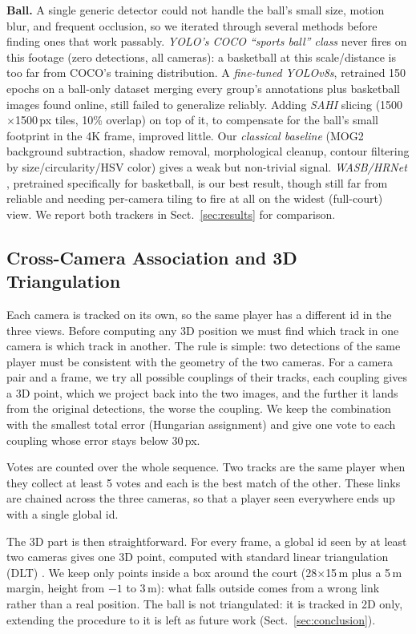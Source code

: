 \documentclass[runningheads]{llncs}
\begin{document}
\textbf{Ball.} A single generic detector could not handle the ball's small size, motion blur, and frequent occlusion, so we iterated through several methods before finding ones that work passably. \emph{YOLO's COCO ``sports ball'' class} never fires on this footage (zero detections, all cameras): a basketball at this scale/distance is too far from COCO's training distribution. A \emph{fine-tuned YOLOv8s}, retrained 150 epochs on a ball-only dataset merging every group's annotations plus basketball images found online, still failed to generalize reliably. Adding \emph{SAHI} \cite{Akyon2022} slicing (1500$\times$1500\,px tiles, 10\% overlap) on top of it, to compensate for the ball's small footprint in the 4K frame, improved little. Our \emph{classical baseline} (MOG2 background subtraction, shadow removal, morphological cleanup, contour filtering by size/circularity/HSV color) gives a weak but non-trivial signal. \emph{WASB/HRNet} \cite{Tarashima2023}, pretrained specifically for basketball, is our best result, though still far from reliable and needing per-camera tiling to fire at all on the widest (full-court) view. We report both trackers in Sect.~\ref{sec:results} for comparison.

\subsection{Cross-Camera Association and 3D Triangulation}
\label{sec:3d_tracking}

Each camera is tracked on its own, so the same player has a different id in the three views. Before computing any 3D position we must find which track in one camera is which track in another. The rule is simple: two detections of the same player must be consistent with the geometry of the two cameras. For a camera pair and a frame, we try all possible couplings of their tracks, each coupling gives a 3D point, which we project back into the two images, and the further it lands from the original detections, the worse the coupling. We keep the combination with the smallest total error (Hungarian assignment) and give one vote to each coupling whose error stays below 30\,px.

Votes are counted over the whole sequence. Two tracks are the same player when they collect at least 5 votes and each is the best match of the other. These links are chained across the three cameras, so that a player seen everywhere ends up with a single global id.

The 3D part is then straightforward. For every frame, a global id seen by at least two cameras gives one 3D point, computed with standard linear triangulation (DLT) \cite{Hartley2004}. We keep only points inside a box around the court (28$\times$15\,m plus a 5\,m margin, height from $-1$ to 3\,m): what falls outside comes from a wrong link rather than a real position. The ball is not triangulated: it is tracked in 2D only, extending the procedure to it is left as future work (Sect.~\ref{sec:conclusion}).
\end{document}
